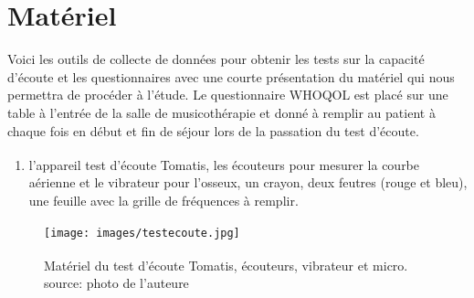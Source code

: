 


\section{Matériel}
Voici les outils de collecte de données pour obtenir les tests sur la capacité d'écoute  et les 
questionnaires 
avec une courte présentation du matériel qui nous permettra de procéder à l'étude. Le questionnaire 
WHOQOL est placé sur une table à l'entrée de la salle de musicothérapie 
et donné à remplir au patient à chaque fois  en début et fin de séjour lors de la passation du test 
d'écoute.  
\begin{enumerate}
	\item l'appareil
	test d'écoute Tomatis\textsuperscript \textregistered , les écouteurs pour mesurer la courbe  aérienne 
	et le vibrateur pour l'osseux, un crayon, 
	deux
	feutres (rouge et bleu), une feuille avec la grille de fréquences à
	remplir.


 
\end{enumerate}
\begin{figure}
	\centering
	\texttt{[image: images/testecoute.jpg]}
	\caption[Appareil test écoute Tomatis ]{Matériel du test d'écoute Tomatis\textsuperscript 
	\textregistered , écouteurs, vibrateur et micro. 
	source:  photo 
	de 
	l'auteure}
	
	\label{appareiltestecoute}
\end{figure}

